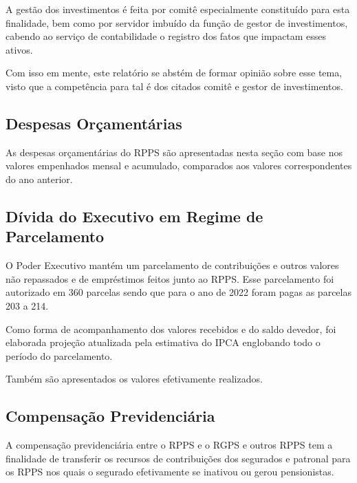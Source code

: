 \documentclass[12pt, a4paper]{article}
\begin{document}
A gestão dos investimentos é feita por comitê especialmente constituído para esta finalidade, bem como por servidor imbuído da função de gestor de investimentos, cabendo ao serviço de contabilidade o registro dos fatos que impactam esses ativos.

Com isso em mente, este relatório se abstém de formar opinião sobre esse tema, visto que a competência para tal é dos citados comitê e gestor de investimentos.



\subsection{Despesas Orçamentárias}

As despesas orçamentárias do RPPS são apresentadas nesta seção com base nos valores empenhados mensal e acumulado, comparados aos valores correspondentes do ano anterior.








\subsection{Dívida do Executivo em Regime de Parcelamento}

O Poder Executivo mantém um parcelamento de contribuições e outros valores não repassados e de empréstimos feitos junto ao RPPS. Esse parcelamento foi autorizado em 360 parcelas sendo que para o ano de 2022 foram pagas as parcelas 203 a 214.

Como forma de acompanhamento dos valores recebidos e do saldo devedor, foi elaborada projeção atualizada pela estimativa do IPCA englobando todo o período do parcelamento.

Também são apresentados os valores efetivamente realizados.



\subsection{Compensação Previdenciária}

A compensação previdenciária entre o RPPS e o RGPS e outros RPPS tem a finalidade de transferir os recursos de contribuições dos segurados e patronal para os RPPS nos quais o segurado efetivamente se inativou ou gerou pensionistas.
\end{document}
